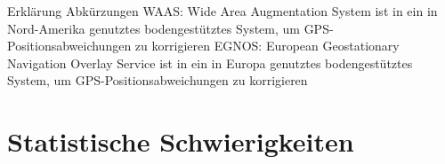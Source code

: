 Erklärung Abkürzungen
WAAS: 
Wide Area Augmentation System ist in ein in Nord-Amerika genutztes bodengestütztes System, um GPS-Positionsabweichungen zu korrigieren
EGNOS: 
European Geostationary Navigation Overlay Service ist in ein in Europa genutztes bodengestütztes System, um GPS-Positionsabweichungen zu korrigieren





\section{Statistische Schwierigkeiten}
\label{ch:Relativierung:sec:StatistischeSchwierigkeiten}









